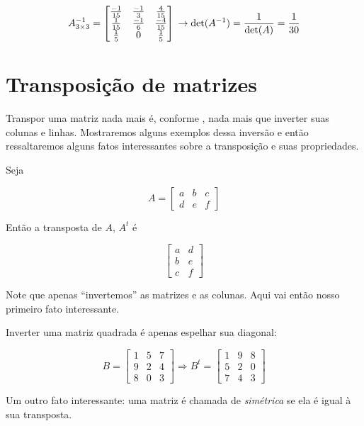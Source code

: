 \documentclass[
  portuguese,
  letterpaper,
  DIV=11,
  numbers=noendperiod]{scrreport}
\begin{document}
\[
A^{-1}_{3\times3} =
\begin{bmatrix}
    \frac{-1}{15} & \frac{-1}{3} & \frac{4}{15}  \\
    \frac{1}{15} & \frac{-1}{6} & \frac{-4}{15} \\
    \frac{1}{5} & 0 & \frac{1}{5} \\
\end{bmatrix}  \\
\rightarrow \det(A^{-1}) = \frac{1}{\det(A)} = \frac{1}{30}
\]

\section{Transposição de matrizes}\label{transposiuxe7uxe3o-de-matrizes}

Transpor uma matriz nada mais é, conforme
\textcite{hartman_matrix_2021}, nada mais que inverter suas colunas e
linhas. Mostraremos alguns exemplos dessa inversão e então ressaltaremos
alguns fatos interessantes sobre a transposição e suas propriedades.

Seja

\[
A = \begin{bmatrix}
    a & b & c \\
    d & e & f
\end{bmatrix}
\]

Então a transposta de \(A\), \(A^{t}\) é

\[
\begin{bmatrix}
    a & d \\
    b & e \\
    c & f
\end{bmatrix}
\]

Note que apenas ``invertemos'' as matrizes e as colunas. Aqui vai então
nosso primeiro fato interessante.

Inverter uma matriz quadrada é apenas espelhar sua diagonal:

\[
B = \begin{bmatrix}
    1 & 5 & 7 \\
    9 & 2 & 4 \\
    8 & 0 & 3
\end{bmatrix} \Rightarrow B^{t} =
\begin{bmatrix}
    1 & 9 & 8 \\
    5 & 2 & 0 \\
    7 & 4 & 3
\end{bmatrix}
\]

Um outro fato interessante: uma matriz é chamada de \emph{simétrica} se
ela é igual à sua transposta.
\end{document}
